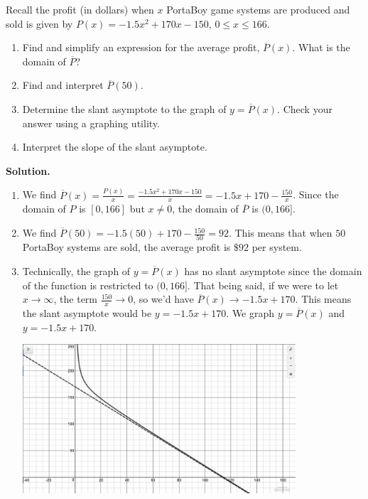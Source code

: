 \documentclass{ximera}
\begin{document}
\begin{ex} \label{PortaBoyAverageProfit}  Recall the profit (in dollars) when $x$ PortaBoy game systems are produced and sold is given by $P(x) =  -1.5x^2+170x-150$, $0 \leq x \leq 166$.

\begin{enumerate}

\item  Find and simplify an expression for the average profit, $\overline{P}(x)$.  What is the domain of $\overline{P}$?

\item Find and interpret $\overline{P}(50)$.

\item Determine the slant asymptote to the graph of $y = \overline{P}(x)$.  Check your answer using a graphing utility.

\item  Interpret the slope of the slant asymptote.


\end{enumerate}

{\bf Solution.}

\begin{enumerate}

\item  We find $\overline{P}(x)  = \frac{P(x)}{x} = \frac{ -1.5x^2+170x-150}{x} = -1.5x + 170 - \frac{150}{x}$.  Since the domain of $P$ is $[0, 166]$ but $x \neq 0$, the domain of $\overline{P}$ is $(0, 166]$.

\item  We find $\overline{P}(50) = -1.5(50)+170 - \frac{150}{50} = 92$.  This means that when $50$ PortaBoy systems are sold, the average profit is $\$ 92$ per system.

\item  Technically, the graph of $y = \overline{P}(x)$ has no slant asymptote since the domain of the function is restricted to $(0, 166]$.  That being said, if we were to let $x \rightarrow \infty$, the term $\frac{150}{x} \rightarrow 0$, so we'd  have $\overline{P}(x)  \rightarrow -1.5x + 170$.  This means the slant asymptote would be $y = -1.5x + 170$.  We graph $y = \overline{P}(x)$ and $y = -1.5x+170$.

  
\begin{center}
   
\includegraphics[width=4in]{./IntroRationalGraphics/SAEx06.jpg}


\end{center}
\end{enumerate}
\end{ex}
\end{document}
